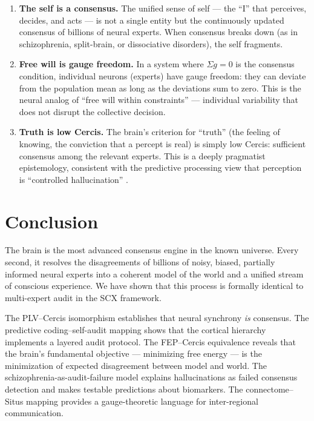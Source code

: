 \documentclass[12pt,a4paper]{article}
\theoremstyle{remark}
\newcommand{\SCX}{\textsf{SCX}}
\newcommand{\Cercis}{\textsf{Cercis}}
\begin{document}
\begin{enumerate}[label=(\roman*)]
    \item \textbf{The self is a consensus.} The unified sense of self --- the
          ``I'' that perceives, decides, and acts --- is not a single entity
          but the continuously updated consensus of billions of neural experts.
          When consensus breaks down (as in schizophrenia, split-brain, or
          dissociative disorders), the self fragments.
    \item \textbf{Free will is gauge freedom.} In a system where $\Sigma g = 0$
          is the consensus condition, individual neurons (experts) have gauge
          freedom: they can deviate from the population mean as long as the
          deviations sum to zero. This is the neural analog of ``free will
          within constraints'' --- individual variability that does not disrupt
          the collective decision.
    \item \textbf{Truth is low \Cercis{}.} The brain's criterion for ``truth''
          (the feeling of knowing, the conviction that a percept is real) is
          simply low \Cercis{}: sufficient consensus among the relevant experts.
          This is a deeply pragmatist epistemology, consistent with the
          predictive processing view that perception is ``controlled
          hallucination'' \cite{seth2017hallucinations, clark2015surfing}.
\end{enumerate}

\section{Conclusion}
\label{sec:conclusion}

The brain is the most advanced consensus engine in the known universe. Every
second, it resolves the disagreements of billions of noisy, biased, partially
informed neural experts into a coherent model of the world and a unified
stream of conscious experience. We have shown that this process is formally
identical to multi-expert audit in the \SCX{} framework.

The PLV--Cercis isomorphism establishes that neural synchrony \emph{is}
consensus. The predictive coding--self-audit mapping shows that the cortical
hierarchy implements a layered audit protocol. The FEP--Cercis equivalence
reveals that the brain's fundamental objective --- minimizing free energy ---
is the minimization of expected disagreement between model and world. The
schizophrenia-as-audit-failure model explains hallucinations as failed
consensus detection and makes testable predictions about biomarkers. The
connectome--Situs mapping provides a gauge-theoretic language for
inter-regional communication.
\end{document}
